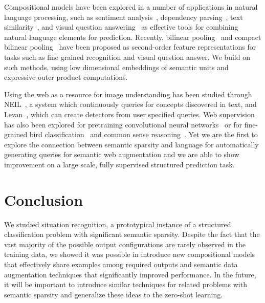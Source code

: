 \documentclass[10pt,twocolumn,letterpaper]{article}
\begin{document}
Compositional models have been explored in a number of applications in natural language processing, such as sentiment analysis~\cite{richard_sentiment}, dependency parsing~\cite{lei2014low},  text similarity~\cite{baroni_tensor}, and visual question answering~\cite{jacob_vqa} as effective tools for combining natural language elements for prediction. 
Recently, bilinear pooling~\cite{bilinearpool} and compact bilinear pooling~\cite{compactbilinear} have been proposed as second-order feature representations for tasks such as fine grained recognition and visual question answer. We build on such methods, using low dimensional embeddings of semantic units and expressive outer product computations. 

Using the web as a resource for image understanding has been studied through NEIL~\cite{chen2013neil}, a system which continuously queries for concepts discovered in text, and Levan~\cite{levan}, which can create detectors from user specified queries. 
Web supervision has also been explored for pretraining convolutional neural networks~\cite{chen2015webly} or for fine-grained bird classification~\cite{chen2015webly} and common sense reasoning~\cite{viske}.
Yet we are the first to explore the connection between semantic sparsity and language for automatically generating queries for semantic web augmentation and we are able to show improvement on a large scale, fully supervised structured prediction task. 
















 \section{Conclusion}
We studied situation recognition, a prototypical instance of a structured classification problem with significant semantic sparsity. 
Despite the fact that the vast majority of the possible output configurations are rarely observed in the training data, we showed it was possible in introduce new compositional models that effectively share examples among required outputs and semantic data augmentation  techniques  that  significantly improved performance. 
In the future, it will be important to introduce similar techniques for related problems with semantic sparsity and generalize these ideas to the zero-shot learning.  
{\small


}
\end{document}
